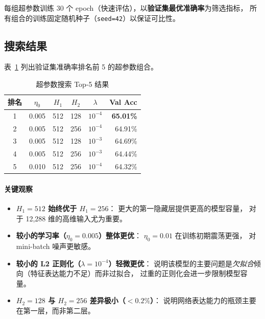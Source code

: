 \documentclass[12pt, a4paper]{article}
\begin{document}
每组超参数训练 30 个 epoch（快速评估），以\textbf{验证集最优准确率}为筛选指标，
所有组合的训练固定随机种子（\texttt{seed=42}）以保证可比性。

\subsection{搜索结果}

表~\ref{tab:hp_results} 列出验证集准确率排名前 5 的超参数组合。

\begin{table}[H]
  \centering
  \caption{超参数搜索 Top-5 结果}
  \label{tab:hp_results}
  \begin{tabular}{cccccr}
    \toprule
    \textbf{排名} & $\eta_0$ & $H_1$ & $H_2$ & $\lambda$ & \textbf{Val Acc} \\
    \midrule
    1 & 0.005 & 512 & 128 & $10^{-4}$ & \textbf{65.01\%} \\
    2 & 0.005 & 512 & 256 & $10^{-4}$ & 64.91\% \\
    3 & 0.005 & 512 & 128 & $10^{-3}$ & 64.69\% \\
    4 & 0.005 & 512 & 256 & $10^{-3}$ & 64.44\% \\
    5 & 0.010 & 512 & 256 & $10^{-4}$ & 64.32\% \\
    \bottomrule
  \end{tabular}
\end{table}

\paragraph{关键观察}
\begin{itemize}[leftmargin=2em]
  \item \textbf{$H_1 = 512$ 始终优于 $H_1 = 256$}：
    更大的第一隐藏层提供更高的模型容量，
    对于 12,288 维的高维输入尤为重要。
  \item \textbf{较小的学习率（$\eta_0 = 0.005$）整体更优}：
    $\eta_0 = 0.01$ 在训练初期震荡更强，
    对 mini-batch 噪声更敏感。
  \item \textbf{较小的 L2 正则化（$\lambda = 10^{-4}$）轻微更优}：
    说明该模型的主要问题是\emph{欠拟合}倾向（特征表达能力不足）而非过拟合，
    过重的正则化会进一步限制模型容量。
  \item \textbf{$H_2 = 128$ 与 $H_2 = 256$ 差异极小（$<0.2\%$）}：
    说明网络表达能力的瓶颈主要在第一层，而非第二层。
\end{itemize}

\end{document}
